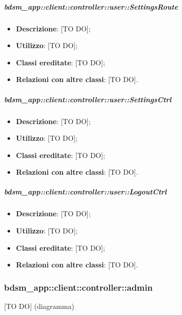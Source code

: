 		\subparagraph{bdsm\_app::client::controller::user::SettingsRoute} %
		\label{subp:bdsm_app_client_controller_user_settingsroute}
			\begin{itemize}
				\item \textbf{Descrizione}: [TO DO];
				\item \textbf{Utilizzo}: [TO DO];
				\item \textbf{Classi ereditate}: [TO DO];
				\item \textbf{Relazioni con altre classi}: [TO DO].
			\end{itemize}

		\subparagraph{bdsm\_app::client::controller::user::SettingsCtrl} %
		\label{subp:client_controller_user_settingsctrl}
			\begin{itemize}
				\item \textbf{Descrizione}: [TO DO];
				\item \textbf{Utilizzo}: [TO DO];
				\item \textbf{Classi ereditate}: [TO DO];
				\item \textbf{Relazioni con altre classi}: [TO DO].
			\end{itemize}

		\subparagraph{bdsm\_app::client::controller::user::LogoutCtrl} %
		\label{subp:bdsm_app_client_controller_user_logoutctrl}
			\begin{itemize}
				\item \textbf{Descrizione}: [TO DO];
				\item \textbf{Utilizzo}: [TO DO];
				\item \textbf{Classi ereditate}: [TO DO];
				\item \textbf{Relazioni con altre classi}: [TO DO].
			\end{itemize}







\subsubsection{bdsm\_app::client::controller::admin} %
\label{ssub:bdsm_app_client_controller_admin}
[TO DO] (diagramma) \newline \newline

